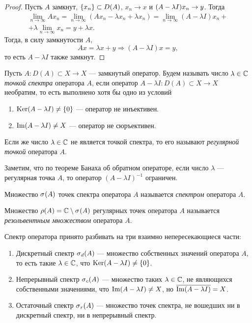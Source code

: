 \begin{proof}
    Пусть $A$ замкнут, $\menge{x_n} \subset D(A)$, $x_n \to x$ и $(A \hm- \lambda I)x_n \hm\to y$.
    Тогда
    \begin{multline*}
        \lim_{n\to \infty} Ax_n = \lim_{n\to \infty} (Ax_n - \lambda x_n + \lambda x_n) = 
            \lim_{n\to \infty} (A - \lambda I)x_n + \\ + \lambda \lim_{n\to \infty} x_n 
            = y + \lambda x.
    \end{multline*}
    Тогда, в силу замкнутости $A$,
    \[ Ax = \lambda x + y \Rightarrow (A - \lambda I)x = y, \]
    то есть $A - \lambda I$ также замкнут.
\end{proof}

\begin{definition}
    Пусть $A \colon D(A) \subset X \to X$ --- замкнутый оператор. 
    Будем называть число $\lambda \in \fieldc$ \emph{точкой спектра} оператора $A$, если оператор 
    $ A - \lambda I \colon D(A) \subset X \to X $ необратим, то есть выполнено хотя бы одно из 
    условий
    \begin{enumerate}
        \item $\ker (A - \lambda I) \neq \menge{0}$ --- оператор не инъективен.
        \item $\im (A - \lambda I) \neq X$ --- оператор не сюръективен.
    \end{enumerate}

    Если же число $\lambda \in \fieldc$ не является точкой спектра, то его называют
    \emph{регулярной точкой} оператора $A$.
\end{definition}

Заметим, что по теореме Банаха об обратном операторе, если число $\lambda$ --- регулярная точка
$A$, то оператор $(A - \lambda I)^{-1}$ ограничен.

\begin{definition}
    Множество $\spectrum{A}$ точек спектра оператора $A$ называется \emph{спектром} оператора $A$.
\end{definition}   

\begin{definition}
    Множество $\resset{A} = \fieldc \setminus \spectrum{A}$ регулярных точек оператора $A$
    называется \emph{резольвентным множеством} оператора $A$.
\end{definition}

Спектр оператора принято разбивать на три взаимно непересекающиеся части:
\begin{enumerate}
    \item Дискретный спектр $\spectrum[d]{A}$ --- множество собственных значений оператора $A$, то есть такие $\lambda \in \fieldc$, что $\ker (A - \lambda I) \neq \menge{0}$.
    \item Непрерывный спектр $\spectrum[c]{A}$ --- множество таких $\lambda \in \fieldc$, не
    являющихся собственными значениями, что $\im (A - \lambda I) \neq X$, но 
    $\overline{\im (A - \lambda I)} = X$.
    \item Остаточный спектр $\spectrum[r]{A}$ --- множество точек спектра, не вошедших ни в
    дискретный спектр, ни в непрерывный спектр.
\end{enumerate}

